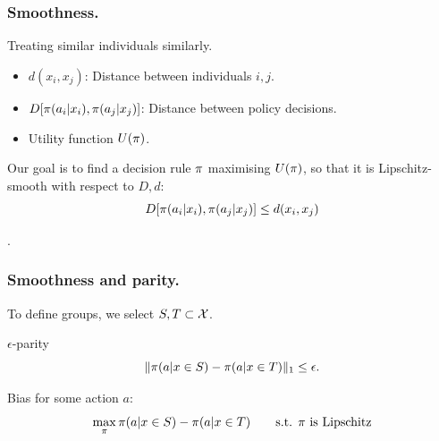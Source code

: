 \begin{frame}\frametitle{Smoothness.}
  \begin{block}{Treating similar individuals similarly.}
    \begin{itemize}
    \item $d(x_i,x_j)$: Distance between individuals $i,j$.
    \item $D[\pi(a_i | x_i), \pi(a_j | x_j)]$: Distance between policy decisions.
    \item Utility function $U(\pi)$.
    \end{itemize}
    Our goal is to find a decision rule $\pi$ maximising  $U(\pi)$, 
    so that it is Lipschitz-smooth with respect to $D, d$:
    \[
      D[\pi(a_i | x_i), \pi(a_j | x_j)] \leq d(x_i,x_j)
    \]
  \end{block}
  .
\end{frame}

\begin{frame}\frametitle{Smoothness and parity.}
  To define groups, we select $S, T \subset {\mathcal{X}}$.
  \begin{definition}{$\epsilon$-parity}
    \[
      \|\pi(a | x \in S) - \pi(a | x \in T)\|_1 \leq \epsilon.
    \]
  \end{definition}

  \begin{definition}{Bias for some action $a$:}
    \[
      \max_\pi \pi(a | x \in S) - \pi(a | x \in T)
      \qquad
      \textrm{s.t. $\pi$ is Lipschitz}
    \]
  \end{definition}
\end{frame}



